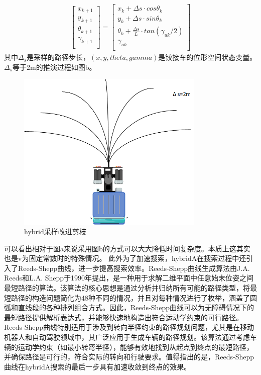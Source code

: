 \documentclass[master,academic]{ysuthesis} %
\begin{document}
		\begin{equation}
			\begin{aligned}
				\left[ \begin{array}{c}
					x_{k+1}\\
					y_{k+1}\\
					\theta _{k+1}\\
					\gamma _{k+1}\\
				\end{array} \right] =\left[ \begin{array}{c}
					x_k+\Delta s\cdot cos\theta _k\\
					y_k+\Delta s\cdot sin\theta _k\\
					\theta _k+\frac{\Delta s}{L}\cdot tan (\gamma _{uk}/2 )\\
					\gamma _{uk}\\
				\end{array} \right] 
			\end{aligned}
		\end{equation}
		其中$\Delta_s$是采样的路径步长，$(x,y,theta,gamma)$是铰接车的位形空间状态变量。$\Delta_s$等于2m的推演过程如图b。
		\begin{figure}[!ht]
			\centering
			\includegraphics[width=0.8\textwidth]{hybrid采样改进剪枝.png}
			\caption{hybrid采样改进剪枝}
			\label{fig:hybrid采样改进剪枝}
		\end{figure}
		可以看出相对于图a来说采用图b的方式可以大大降低时间复杂度。本质上这其实也是v为固定常数时的特殊情况。
		此外为了加速搜索，hybridA在搜索过程中还引入了Reeds-Shepp曲线，进一步提高搜索效率。Reeds-Shepp曲线生成算法由J.A. Reeds和L.A. Shepp于1990年提出，是一种用于求解二维平面中任意始末位姿之间最短路径的算法。该算法的核心思想是通过分析并归纳所有可能的路径类型，将最短路径的构造问题简化为48种不同的情况，并且对每种情况进行了枚举，涵盖了圆弧和直线段的各种排列组合方式。因此，Reeds-Shepp曲线可以为无障碍情况下的最短路径提供解析表达式，并能够快速地构造出符合运动学约束的可行路径。Reeds-Shepp曲线特别适用于涉及到转向半径约束的路径规划问题，尤其是在移动机器人和自动驾驶领域中，其广泛应用于生成车辆的路径规划。该算法通过考虑车辆的运动学约束（如最小转弯半径），能够有效地找到从起点到终点的最短路径，并确保路径是可行的，符合实际的转向和行驶要求。值得指出的是，Reeds-Shepp曲线在hybridA搜索的最后一步具有加速收敛到终点的效果。
\end{document}
